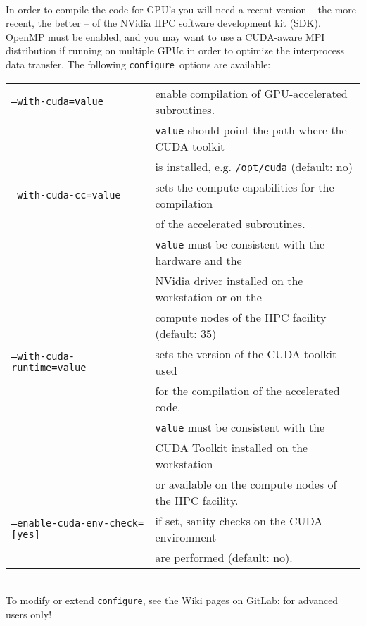 \documentclass[12pt,a4paper]{article}
\def\configure{\texttt{configure}}
\begin{document}
\\
In order to compile the code for GPU's you will need a recent version
-- the more recent, the better -- of the NVidia HPC software development
kit (SDK). OpenMP must be enabled, and you may want to use a CUDA-aware MPI
distribution if running on multiple GPUc in order to optimize the
interprocess data transfer. The following \configure\ options are
available:\\
\begin{tabular}{ll}
\texttt{--with-cuda=value}&         enable compilation of GPU-accelerated subroutines.\\
                          &         \texttt{value} should point the path where the CUDA toolkit \\
                          &         is installed, e.g. \texttt{/opt/cuda} (default: no)\\
\texttt{--with-cuda-cc=value}&      sets the compute capabilities for the compilation\\
                             &      of the accelerated subroutines. \\
                             &      \texttt{value} must be consistent with the hardware and the\\
                             &      NVidia driver installed on the workstation or on the\\
                             &      compute nodes of the HPC facility (default: 35)\\
\texttt{--with-cuda-runtime=value}& sets the version of the CUDA toolkit used \\
                                  & for the compilation of the accelerated code.\\
                                  & \texttt{value} must be consistent with the\\
                                  & CUDA Toolkit installed on the workstation \\
                                  & or available on the compute nodes of the HPC facility.\\
\texttt{--enable-cuda-env-check=[yes]}& if set, sanity checks on the CUDA environment\\
                                      & are performed (default: no).
\end{tabular}\\


To modify or extend \configure, see the Wiki pages on GitLab:
for advanced users only!
\end{document}
